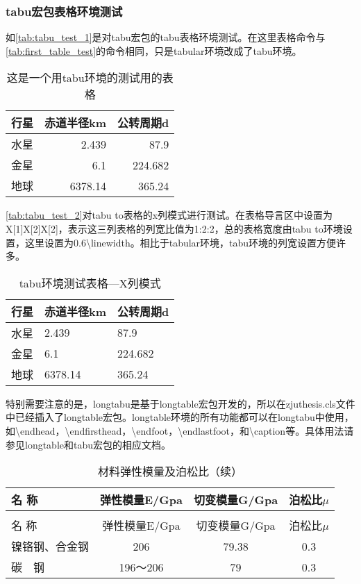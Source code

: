 \subsubsection{tabu宏包表格环境测试}
如\autoref{tab:tabu_test_1}是对tabu宏包的tabu表格环境测试。在这里表格命令与\autoref{tab:first_table_test}的命令相同，只是tabular环境改成了tabu环境。
\begin{table}[htbp]
	\centering
	\caption{这是一个用tabu环境的测试用的表格}\label{tab:tabu_test_1}
    \begin{tabu}{lrr}
    \toprule
    \textbf{行星}     & \textbf{赤道半径}km & \textbf{公转周期}d \\
    \midrule
    水星     & 2.439  & 87.9 \\
    金星     & 6.1    & 224.682 \\
    地球     & 6378.14 & 365.24 \\
    \bottomrule
    \end{tabu}%
\end{table}

\autoref{tab:tabu_test_2}对tabu to表格的x列模式进行测试。在表格导言区中设置为X[1]X[2]X[2]，表示这三列表格的列宽比值为1:2:2，总的表格宽度由tabu to环境设置，这里设置为0.6\textbackslash linewidth。相比于tabular环境，tabu环境的列宽设置方便许多。
\begin{table}[htbp]
	\centering
	\caption{tabu环境测试表格---X列模式}\label{tab:tabu_test_2}
    \begin{tabu} to 0.6\linewidth{X[1]X[2]X[2]}
    \toprule
    \textbf{行星}     & \textbf{赤道半径}km & \textbf{公转周期}d \\
    \midrule
    水星     & 2.439  & 87.9 \\
    金星     & 6.1    & 224.682 \\
    地球     & 6378.14 & 365.24 \\
    \bottomrule
    \end{tabu}%
\end{table}

特别需要注意的是，longtabu是基于longtable宏包开发的，所以在zjuthesis.cls文件中已经插入了longtable宏包。longtable环境的所有功能都可以在longtabu中使用，如\textbackslash endhead，\textbackslash endfirsthead，\textbackslash endfoot，\textbackslash endlastfoot，和\textbackslash caption等。具体用法请参见longtable和tabu宏包的相应文档。
\begin{longtabu}{lccc}
\caption{材料弹性模量及泊松比}\label{tab:tabu_test_3}\\
\toprule
名  称   & 弹性模量E/Gpa & 切变模量G/Gpa & 泊松比$\mu$ \\
\midrule%
\endfirsthead
\caption{材料弹性模量及泊松比（续）}\\
\toprule
名  称   & 弹性模量E/Gpa & 切变模量G/Gpa & 泊松比$\mu$ \\
\midrule%
\endhead
\bottomrule%
\endfoot
镍铬钢、合金钢 & 206    & 79.38  & 0.3 \\
碳　钢    &  196～206 & 79     & 0.3 \\
\end{longtabu}%


